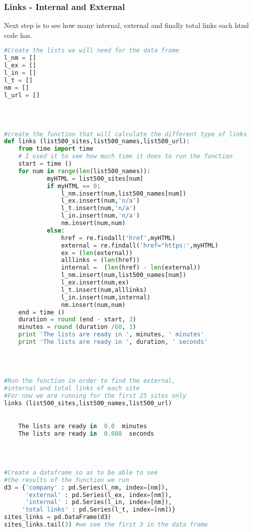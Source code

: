 \documentclass{article}
\begin{document}
\subsubsection{Links - Internal and External}
Next step is to see how many internal, external and finally total links each html code has.
\begin{lstlisting}[language=Python]
#Create the lists we will need for the data frame
l_nm = []
l_ex = []
l_in = []
l_t = []
nm = []
l_url = []
 


 
#create the function that will calculate the different type of links
def links (list500_sites,list500_names,list500_url):
    from time import time 
    # I used it to see how much time it does to run the function
    start = time ()
    for num in range(len(list500_names)):        
            myHTML = list500_sites[num]
            if myHTML == 0:
                l_nm.insert(num,list500_names[num])            
                l_ex.insert(num,'n/a')
                l_t.insert(num,'n/a')
                l_in.insert(num,'n/a')
                nm.insert(num,num)                
            else: 
                href = re.findall('href',myHTML)
                external = re.findall('href="https:',myHTML)
                ex = (len(external))
                alllinks = (len(href))
                internal =  (len(href) - len(external))
                l_nm.insert(num,list500_names[num])            
                l_ex.insert(num,ex)
                l_t.insert(num,alllinks)
                l_in.insert(num,internal)
                nm.insert(num,num)                
    end = time ()
    duration = round (end - start, 3)
    minutes = round (duration /60, 1)
    print 'The lists are ready in ', minutes, ' minutes'
    print 'The lists are ready in ', duration, ' seconds'
 


 
#Run the function in order to find the external, 
#internal and total links of each site
#For now we are running for the first 25 sites only
links (list500_sites,list500_names,list500_url)
 

    The lists are ready in  0.0  minutes
    The lists are ready in  0.088  seconds
    


 
#Create a dataframe so as to be able to see 
#the results of the function we run
d3 = {'company' : pd.Series(l_nm, index=[nm]),
      'external' : pd.Series(l_ex, index=[nm]),
      'internal' : pd.Series(l_in, index=[nm]),
     'total links' : pd.Series(l_t, index=[nm])}
sites_links = pd.DataFrame(d3)    
sites_links.tail(3) #we see the first 3 in the data frame
\end{lstlisting}
\end{document}
